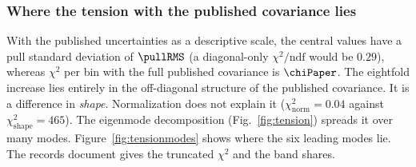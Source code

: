 \subsubsection{Where the tension with the published covariance lies}
\label{sec:results-tension}
With the published uncertainties as a descriptive scale, the central values have a pull standard deviation of $\pullRMS$ (a diagonal-only $\chi^{2}/\mathrm{ndf}$ would be $0.29$), whereas $\chi^{2}$ per bin with the full published covariance is $\chiPaper$. The eightfold increase lies entirely in the off-diagonal structure of the published covariance. It is a difference in \emph{shape}. Normalization does not explain it ($\chi^{2}_{\mathrm{norm}}=0.04$ against $\chi^{2}_{\mathrm{shape}}=465$). The eigenmode decomposition (Fig.~\ref{fig:tension}) spreads it over many modes. Figure~\ref{fig:tensionmodes} shows where the six leading modes lie. The records document gives the truncated $\chi^{2}$ and the band shares.

